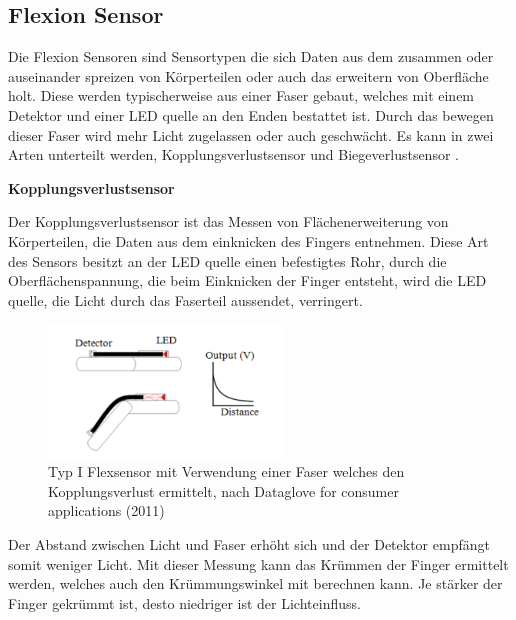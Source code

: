 \subsection{Flexion Sensor}
Die Flexion Sensoren sind Sensortypen die sich Daten aus dem zusammen oder auseinander spreizen von Körperteilen oder auch das erweitern von Oberfläche holt. Diese werden typischerweise aus einer Faser gebaut, welches mit einem Detektor und einer LED quelle an den Enden bestattet ist. Durch das bewegen dieser Faser wird mehr Licht zugelassen oder auch geschwächt. Es kann in zwei Arten unterteilt werden, Kopplungsverlustsensor und Biegeverlustsensor \parencite{datagloveForConsumerApplication}.
\begin{center}
\textbf{Kopplungsverlustsensor}
\end{center}
Der Kopplungsverlustsensor ist das Messen von Flächenerweiterung von Körperteilen, die Daten aus dem einknicken des Fingers entnehmen. Diese Art des Sensors besitzt an der LED quelle einen befestigtes Rohr, durch die Oberflächenspannung, die beim Einknicken der Finger entsteht, wird die LED quelle, die Licht durch das Faserteil aussendet, verringert.
\newpage
\begin{figure}[h]
	\centering
    \includegraphics[height=100pt]{Bachelorarbeit/images/FlexionSensor.png}
    \caption{Typ I Flexsensor mit Verwendung einer Faser welches den Kopplungsverlust ermittelt, nach Dataglove for consumer applications (2011)}
    \label{fig:Kopplungsverlust}
\end{figure}
\bigskip
Der Abstand zwischen Licht und Faser erhöht sich und der Detektor empfängt somit weniger Licht. Mit dieser Messung kann das Krümmen der Finger ermittelt werden, welches auch den Krümmungswinkel mit berechnen kann. Je stärker der Finger gekrümmt ist, desto niedriger ist der Lichteinfluss.



